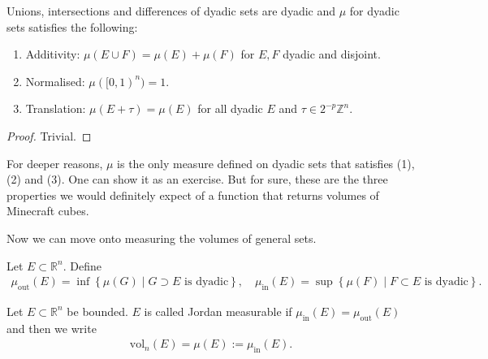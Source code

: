 \begin{prop}[Properties of $\mu$]\label{prop:properties-of-minecraft-measure}
    Unions, intersections and differences of dyadic sets are dyadic and $\mu$ for dyadic sets satisfies the following:
    \begin{enumerate} 
        \item Additivity: $\mu(E \cup F) = \mu(E) + \mu(F)$ for $E, F$ dyadic and disjoint.
        \item Normalised: $\mu([0,1)^{n}) = 1$.
        \item Translation: $\mu(E + \tau) = \mu(E)$ for all dyadic $E$ and $\tau \in 2^{-p}\mathbb{Z}^{n}$.
    \end{enumerate}
\end{prop}
\begin{proof}
    Trivial.
\end{proof}

\begin{remark}
    For deeper reasons, $\mu$ is the only measure defined on dyadic sets that satisfies (1), (2) and (3). One can show it as an exercise. But for sure, these are the three properties we would definitely expect of a function that returns volumes of Minecraft cubes.
\end{remark}

Now we can move onto measuring the volumes of general sets. 

\begin{definition}\label{def:outer-inner-vol}
    Let $E \subset \mathbb{R}^{n}$. Define
    \begin{align*}
        \mu_{\text{out}}(E) = \inf \left\{ \mu(G) \mid G \supset E \text{ is dyadic} \right\}, \quad \mu_{\text{in}}(E) = \sup \left\{ \mu(F) \mid F \subset E \text{ is dyadic} \right\}.
    \end{align*}
\end{definition}

\begin{definition}\label{def:jordan-measure}
    Let $E \subset \mathbb{R}^{n}$ be bounded. $E$ is called Jordan measurable if $\mu_{\text{in}}(E) = \mu_{\text{out}}(E)$ and then we write
    \begin{align*}
        \text{vol}_{n}(E) = \mu(E) := \mu_{\text{in}}(E).
    \end{align*}
\end{definition}

